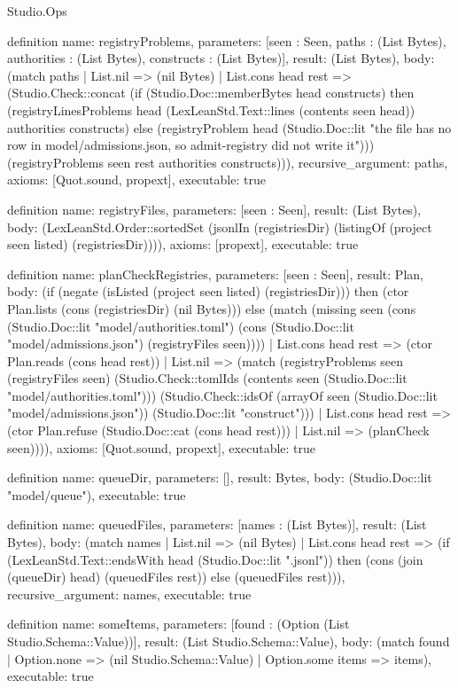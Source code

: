\begin{lexlean}{Studio.Ops}
\begin{semanticmodule}
{definition{
  name: registryProblems,
  parameters: [seen : Seen, paths : (List Bytes), authorities : (List Bytes), constructs : (List Bytes)],
  result: (List Bytes),
  body: (match paths
    | List.nil => (nil Bytes)
    | List.cons head rest => (Studio.Check::concat (if (Studio.Doc::memberBytes head constructs) then (registryLinesProblems head (LexLeanStd.Text::lines (contents seen head)) authorities constructs) else (registryProblem head (Studio.Doc::lit "the file has no row in model/admissions.json, so admit-registry did not write it"))) (registryProblems seen rest authorities constructs))),
  recursive_argument: paths,
  axioms: [Quot.sound, propext],
  executable: true
}

definition{
  name: registryFiles,
  parameters: [seen : Seen],
  result: (List Bytes),
  body: (LexLeanStd.Order::sortedSet (jsonlIn (registriesDir) (listingOf (project seen listed) (registriesDir)))),
  axioms: [propext],
  executable: true
}

definition{
  name: planCheckRegistries,
  parameters: [seen : Seen],
  result: Plan,
  body: (if (negate (isListed (project seen listed) (registriesDir))) then (ctor Plan.lists (cons (registriesDir) (nil Bytes))) else (match (missing seen (cons (Studio.Doc::lit "model/authorities.toml") (cons (Studio.Doc::lit "model/admissions.json") (registryFiles seen))))
    | List.cons head rest => (ctor Plan.reads (cons head rest))
    | List.nil => (match (registryProblems seen (registryFiles seen) (Studio.Check::tomlIds (contents seen (Studio.Doc::lit "model/authorities.toml"))) (Studio.Check::idsOf (arrayOf seen (Studio.Doc::lit "model/admissions.json")) (Studio.Doc::lit "construct")))
      | List.cons head rest => (ctor Plan.refuse (Studio.Doc::cat (cons head rest)))
      | List.nil => (planCheck seen)))),
  axioms: [Quot.sound, propext],
  executable: true
}

definition{
  name: queueDir,
  parameters: [],
  result: Bytes,
  body: (Studio.Doc::lit "model/queue"),
  executable: true
}

definition{
  name: queuedFiles,
  parameters: [names : (List Bytes)],
  result: (List Bytes),
  body: (match names
    | List.nil => (nil Bytes)
    | List.cons head rest => (if (LexLeanStd.Text::endsWith head (Studio.Doc::lit ".jsonl")) then (cons (join (queueDir) head) (queuedFiles rest)) else (queuedFiles rest))),
  recursive_argument: names,
  executable: true
}

definition{
  name: someItems,
  parameters: [found : (Option (List Studio.Schema::Value))],
  result: (List Studio.Schema::Value),
  body: (match found
    | Option.none => (nil Studio.Schema::Value)
    | Option.some items => items),
  executable: true
}

}
\end{semanticmodule}
\end{lexlean}
